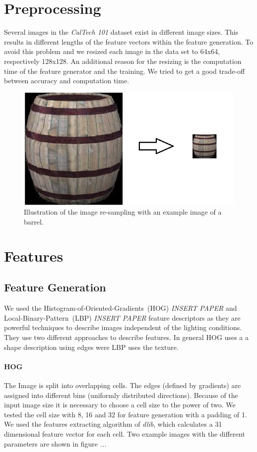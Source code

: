 \documentclass[a4paper,10pt]{article}
\begin{document}
\section{Preprocessing}
\label{sec:preprocessing}
Several images in the \emph{CalTech 101} dataset exist in different image sizes. 
This results in different lengths of the feature vectors within the feature generation.
To avoid this problem and we resized each image in the data set to 64x64, respectively 128x128.
An additional reason for the resizing is the computation time of the feature generator and the training. 
We tried to get a good trade-off between accuracy and computation time.
\begin{figure}[ht]
\centering
\includegraphics[scale=0.5]{images/preprocessing.png}
\caption{Illustration of the image re-sampling with an example image of a barrel.}
\label{fig:resize}
\end{figure}

\section{Features}
\subsection{Feature Generation}

We used the Histogram-of-Oriented-Gradients~(HOG) \emph{INSERT PAPER} and Local-Binary-Pattern~(LBP) \emph{INSERT PAPER} feature descriptors as they are powerful techniques to describe images independent of the lighting conditions. They use two different approaches to describe features. In general HOG uses a a shape description using edges were LBP uses the texture.

\paragraph{HOG} 
The Image is split into overlapping cells. The edges (defined by gradients) are assigned into different bins (uniformly distributed directions).
Because of the input image size it is necessary to choose a cell size to the power of two. 
We tested the cell size with 8, 16 and 32 for feature generation with a padding of 1.
We used the features extracting algorithm of \emph{dlib}, which calculates a 31 dimensional feature vector for each cell.
Two example images with the different parameters are shown in figure \emph{...}
\end{document}
